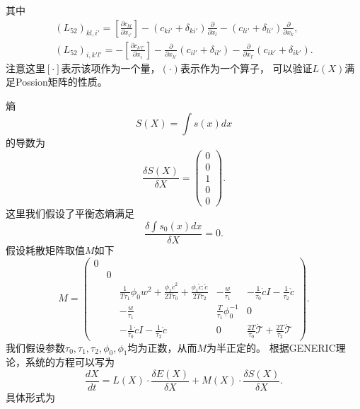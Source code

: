 	其中
	\begin{eqnarray*}
		(L_{52})_{kl,i'} = [\frac{\partial {c_{kl}}}{\partial x_{i'}}] - (c_{ki'} + \delta_{ki'}) \frac{\partial}{\partial x_l} - ( c_{li'} + \delta_{li'}) \frac{\partial}{\partial x_{k}}, \\
		(L_{52})_{i,k'l'} = -[\frac{\partial {c_{k'l'}}}{\partial x_{i}}] - \frac{\partial}{\partial x_{k'}} (c_{il'} + \delta_{il'})  - \frac{\partial}{\partial x_{l'}} ( c_{ik'} + \delta_{ik'}).
	\end{eqnarray*}
	注意这里$[\cdot]$表示该项作为一个量，$(\cdot)$表示作为一个算子，
	可以验证$L(X)$满足Possion矩阵的性质。

	熵
	\begin{equation*}
		S(X) = \int s(x) dx
	\end{equation*}
	的导数为
	\begin{equation*}
		\frac{\delta S(X)}{ \delta X} = \left( \begin{array}{c} 0 \\ 0 \\ 1 \\  0 \\ 0 \end{array} \right).
	\end{equation*}
	这里我们假设了平衡态熵满足
	\begin{equation*}
		\frac{\delta \int s_0(x) dx}{ \delta X} = 0. 
	\end{equation*}
	假设耗散矩阵取值$M$如下
	\begin{equation*}
		M = \left( \begin{array}{ccccc} 
		0 & & & & \\
		& 0 & & &  \\
		& & \frac{1}{T \tau_1} \phi_0 w^2 + \frac{\phi_1 \dot{c}^2}{2 T \tau_0} + \frac{\phi_1 \mathring{c}:\mathring{c}}{2 T \tau_2} & -\frac{w}{\tau_1} & -\frac{1}{\tau_0} \dot{c} I - \frac{1}{\tau_2} \mathring{c} \\  
		& &  -\frac{w}{\tau_1} & \frac{T}{\tau_1} \phi_0^{-1} & 0  \\
	    & &  -\frac{1}{\tau_0} \dot{c} I - \frac{1}{\tau_2} \mathring{c} & 0 & \frac{2T}{\tau_0} \dot{\mathcal{T}}   + \frac{2T}{\tau_2}  \mathring{\mathcal{T}}   
		\end{array} \right).
	\end{equation*}
	我们假设参数$\tau_0,\tau_1,\tau_2,\phi_0,\phi_1$均为正数，从而$M$为半正定的。
	根据GENERIC理论，系统的方程可以写为
	\begin{equation*}
		\frac{dX}{dt} = L(X) \cdot \frac{\delta E(X)}{\delta X} + M(X) \cdot \frac{\delta S(X)}{\delta X} .
	\end{equation*}
	具体形式为
	
